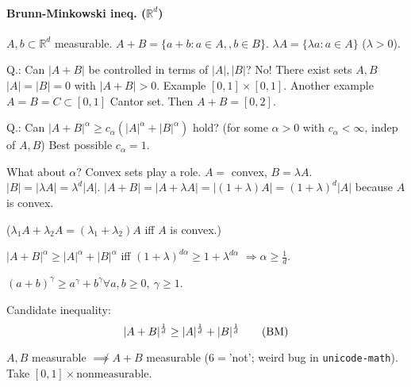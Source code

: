 \paragraph{Brunn-Minkowski ineq. ($ℝ^d$)}
$A,b⊂ℝ^d$ measurable. $A+B=\{a+b:a∈A,,b∈B\}$. $λA=\{λa:a∈A\}$ ($λ>0$).

Q.: Can $|A+B|$ be controlled in terms of $|A|,|B|$? No! There exist sets $A,B$ $|A|=|B|=0$ with $|A+B|>0$. Example $[0,1]\times[0,1]$. Another example $A=B=C⊂[0,1]$ Cantor set. Then $A+B=[0,2]$.

Q.: Can $|A+B|^α\geq c_α(|A|^α+|B|^α)$ hold? (for some $α>0$ with $c_α<∞‚$ indep of $A,B$) Best possible $c_α=1$.

What about $α$? Convex sets play a role. $A=$ convex, $B=λA$. $|B|=|λA|=λ^d|A|$. $|A+B|=|A+λA|=|(1+λ)A|=(1+λ)^d|A|$ because $A$ is convex.

($λ_1A+λ_2A=(λ_1+λ_2)A$ iff $A$ is convex.)

$|A+B|^α\geq |A|^α+|B|^α$ iff $(1+λ)^{dα}\geq 1+λ^{dα}$ $⇒α\geq\frac1d$.

$(a+b)^γ\geq a^γ+b^γ∀a,b\geq 0,\ γ\geq 1$.

Candidate inequality: 
\begin{equation}
	|A+B|^{\frac1d}\geq|A|^{\frac1d}+|B|^{\frac1d}
	\tag{\text{BM}}
	\label{eq:bm}
\end{equation}

$A,B$ measurable $\not\implies A+B$ measurable ($6=$'not'; weird bug in \texttt{unicode-math}). Take $[0,1]\times\text{nonmeasurable}$.

